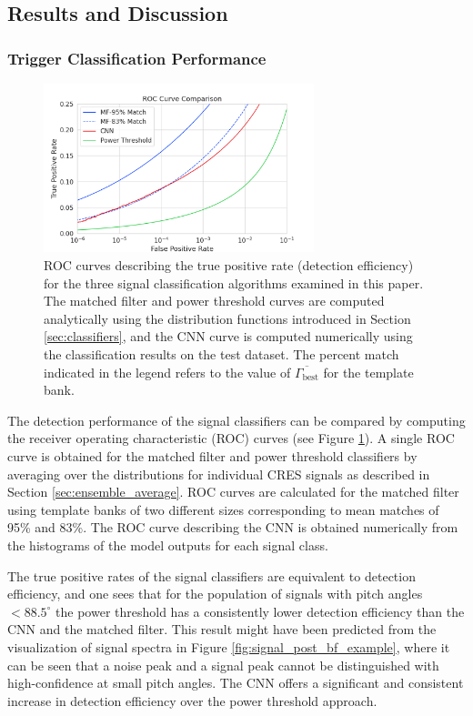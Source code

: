 \subsection{Results and Discussion}
\label{sec:results}

\subsubsection{Trigger Classification Performance}

\begin{figure}[htbp]
    \centering
    \includegraphics[width=0.7\textwidth]{figs/Chapter-4/230927_nn_roc_vs_mf_vs_fft.png}
    \caption{ROC curves describing the true positive rate (detection efficiency) for the three signal classification algorithms examined in this paper. The matched filter and power threshold curves are computed analytically using the distribution functions introduced in Section \ref{sec:classifiers}, and the CNN curve is computed numerically using the classification results on the test dataset. The percent match indicated in the legend refers to the value of $\overline{\Gamma_\mathrm{best}}$ for the template bank.
    }
    \label{fig:roc_compare}
\end{figure}
The detection performance of the signal classifiers can be compared by computing the receiver operating characteristic (ROC) curves (see Figure \ref{fig:roc_compare}).
A single ROC curve is obtained for the matched filter and power threshold classifiers by averaging over the distributions for individual CRES signals as described in Section \ref{sec:ensemble_average}. ROC curves are calculated for the matched filter using template banks of two different sizes corresponding to mean matches of 95\% and 83\%. The ROC curve describing the CNN is obtained numerically from the histograms of the model outputs for each signal class.

The true positive rates of the signal classifiers are equivalent to detection efficiency, and one sees that for the population of signals with pitch angles $<88.5^\circ$ the power threshold has a consistently lower detection efficiency than the CNN and the matched filter. This result might have been predicted from the visualization of signal spectra in Figure \ref{fig:signal_post_bf_example}, where it can be seen that a noise peak and a signal peak cannot be distinguished with high-confidence at small pitch angles. The CNN offers a significant and consistent increase in detection efficiency over the power threshold approach. 

